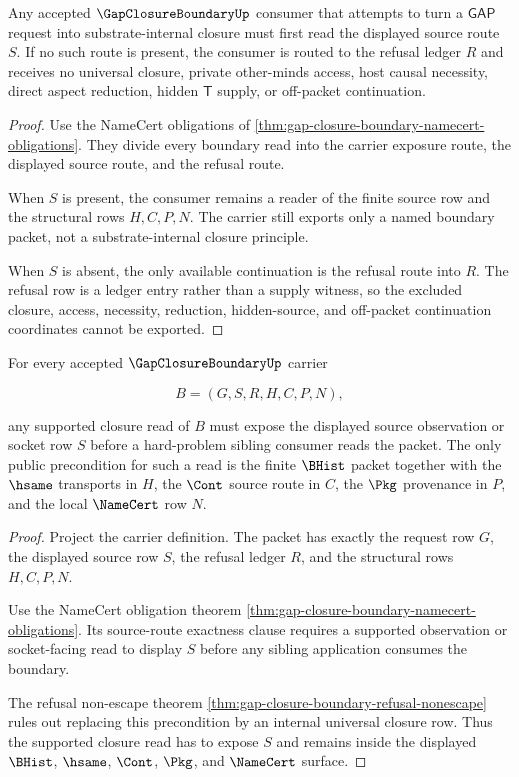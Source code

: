 \begin{theorem}
\label{thm:gap-closure-boundary-refusal-nonescape}
Any accepted $\GapClosureBoundaryUp$ consumer that attempts to turn a $\mathsf{GAP}$ request into substrate-internal closure must first read the displayed source route $S$. If no such route is present, the consumer is routed to the refusal ledger $R$ and receives no universal closure, private other-minds access, host causal necessity, direct aspect reduction, hidden $\mathsf{T}$ supply, or off-packet continuation.
\end{theorem}
\begin{proof}
Use the NameCert obligations of \autoref{thm:gap-closure-boundary-namecert-obligations}. They divide every boundary read into the carrier exposure route, the displayed source route, and the refusal route.

When $S$ is present, the consumer remains a reader of the finite source row and the structural rows $H,C,P,N$. The carrier still exports only a named boundary packet, not a substrate-internal closure principle.

When $S$ is absent, the only available continuation is the refusal route into $R$. The refusal row is a ledger entry rather than a supply witness, so the excluded closure, access, necessity, reduction, hidden-source, and off-packet continuation coordinates cannot be exported.
\end{proof}

\begin{theorem}
\label{thm:gap-closure-boundary-displayed-source-precondition}
For every accepted $\GapClosureBoundaryUp$ carrier

$$
B=(G,S,R,H,C,P,N),
$$

any supported closure read of $B$ must expose the displayed source observation or socket row $S$ before a hard-problem sibling consumer reads the packet. The only public precondition for such a read is the finite $\BHist$ packet together with the $\hsame$ transports in $H$, the $\Cont$ source route in $C$, the $\Pkg$ provenance in $P$, and the local $\NameCert$ row $N$.
\end{theorem}
\begin{proof}
Project the carrier definition. The packet has exactly the request row $G$, the displayed source row $S$, the refusal ledger $R$, and the structural rows $H,C,P,N$.

Use the NameCert obligation theorem \autoref{thm:gap-closure-boundary-namecert-obligations}. Its source-route exactness clause requires a supported observation or socket-facing read to display $S$ before any sibling application consumes the boundary.

The refusal non-escape theorem \autoref{thm:gap-closure-boundary-refusal-nonescape} rules out replacing this precondition by an internal universal closure row. Thus the supported closure read has to expose $S$ and remains inside the displayed $\BHist$, $\hsame$, $\Cont$, $\Pkg$, and $\NameCert$ surface.
\end{proof}

